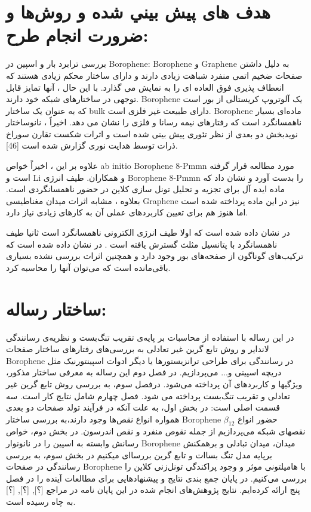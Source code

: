 \section{هدف های پيش بيني شده و روش‌ها و ضرورت انجام طرح:}
بررسی ترابرد بار و اسپین در \gls{Borophene}:
\gls{Borophene} و \gls{Graphene} به دلیل داشتن صفحات ضخیم اتمی منفرد شباهت زیادی دارند و دارای ساختار محکم زیادی هستند که انعطاف پذیری فوق العاده ای را به نمایش می گذارد. با این حال ، آنها تمایز قابل توجهی در ساختارهای شبکه خود دارند. \gls{Borophene} یک آلوتروپ کریستالی از بور است که به عنوان یک ساختار \gls{bulk} دارای طبیعت غیر فلزی است. \gls{Borophene} ماده‌ای بسیار ناهمسانگرد است که رفتارهای نیمه رسانا و فلزی را نشان می دهد. اخیراً ، نانوساختار نویدبخش دو بعدی از نظر تئوری پیش بینی شده است و اثرات شکست تقارن سوراخ ذرات توسط هدایت نوری گزارش شده است [46]. 

علاوه بر این ، اخیراً خواص \gls{ab initio}  \gls{Borophene} 8-Pmmn مورد مطالعه قرار گرفته است \cite{lopez2016electronic} و \gls{Li} و همکاران. \cite{li2017generation} طیف انرژی \gls{Borophene} 8-Pmmn را بدست آورد و نشان داد که ماده ایده آل برای تجزیه و تحلیل تونل سازی کلاین در حضور ناهمسانگردی است. بعلاوه ، مشابه اثرات میدان مغناطیسی \gls{Graphene} نیز در این ماده پرداخته شده است \cite{zabolotskiy2016strain} اما هنوز هم برای تعیین کاربردهای عملی آن به کارهای زیادی نیاز دارد.

در \cite{defne2019triangular} نشان داده شده است که اولا طیف انرژی الکترونی ناهمسانگرد است ثانیا طیف ناهمسانگرد با پتانسیل مثلث گسترش یافته است .
در \cite{defne2019triangular} نشان داده شده‌ است که ترکیب‌های گوناگون از صفحه‌های بور وجود دارد و همچنین اثرات بررسی نشده بسیاری باقی‌مانده است که می‌توان آنها را محاسبه کرد.

\section{ساختار رساله:}
 در این رساله با استفاده از محاسبات بر پایه‌ی تقریب تنگ‌بست و نظریه‌ی  رسانندگی لانداير و روش تابع گرین غیر تعادلی به بررسی‌های
 رفتارهای ساختار صفحات \gls{Borophene} در رسانندگی برای طراحی ترانزیستورها یا دیگر ادوات اسپینتورنیک مثل دریچه اسپینی و... می‌پردازیم. در فصل دوم 
 این رساله به معرفی ساختار مذکور، ویژگیها و کاربردهای آن  پرداخته می‌شود. درفصل سوم، به
 بررسی روش تابع گرین غیر تعادلی و تقریب تنگ‌بست پرداخته می شود.
 فصل چهارم شامل نتایج کار است. سه قسمت اصلی است: در بخش اول، به علت آنکه در فرآیند تولد صفحات دو بعدی همواره انواع نقص‌ها وجود دارند،به بررسی ساختار \gls{Borophene} $\beta_{12}$ حضور
 انواع نقصهای شبکه می‌پردازیم از جمله نقوص منفرد و نقص اندرسون.  در بخش دوم، خواص رسانش وابسته  به اسپین را در نانونوار \gls{Borophene} میدان، میدان تبادلی و برهمكنش بر‌پایه مدل تنگ بساات و تابع گرین بررساای میکنیم در بخش سوم، به بررسی رسانندگی در صفحات \gls{Borophene} با هامیلتونی موثر و وجود پراکندگی تونل‌زنی کلاین را بررسی می‌کنیم. در پایان جمع بندی نتایج و پیشنهادهایی برای مطالعات آینده را در فصل پنج ارائه کرده‌ایم.
 نتایج پژوهش‌های انجام شده در این پایان نامه در مراجع [؟], [؟], [؟] به چاه رسیده است.
 